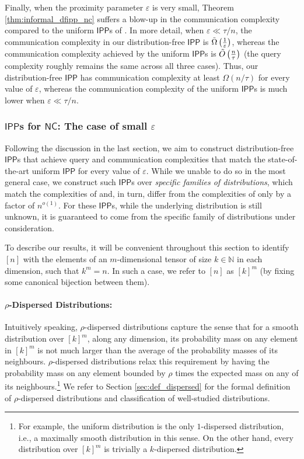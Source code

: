 \documentclass[11pt]{article}
\newcommand{\NC}{\mathsf{NC}}
\newcommand{\IPP}{\mathsf{IPP}}
\newcommand{\N}{\mathbb{N}}
\newcommand{\eps}{\varepsilon}
\begin{document}
Finally, when the proximity parameter $\varepsilon$ is very small, Theorem \ref{thm:informal_dfipp_nc} suffers a blow-up in the communication complexity compared to the uniform $\IPP$s of \cite{RVW,RR20_batch_polylog}. In more detail, when $\varepsilon \ll \tau/n$, the communication complexity in our distribution-free $\IPP$ is $\Tilde{\Omega}\left(\frac{1}{\eps}\right)$, whereas the communication complexity achieved by the uniform $\IPP$s is $\Tilde{O}\left(\frac{n}{\tau}\right)$ (the query complexity roughly remains the same across all three cases). Thus, our distribution-free $\IPP$ has communication complexity at least $\Omega(n/\tau)$ for every value of $\varepsilon$, whereas the communication complexity of the uniform $\IPP$s is much lower when $\varepsilon \ll \tau/n$.

\subsubsection{$\IPP$s for $\NC$: The case of small $\varepsilon$}
Following the discussion in the last section, we aim to construct distribution-free $\IPP$s that achieve query and communication complexities that match the state-of-the-art uniform $\IPP$ for every value of $\varepsilon$. While we unable to do so in the most general case, we construct such $\IPP$s over \textit{specific families of distributions}, which match the complexities of \cite{RVW} and, in turn, differ from the complexities of \cite{RR20_batch_polylog} only by a factor of $n^{o(1)}$. For these $\IPP$s, while the underlying distribution is still unknown, it is guaranteed to come from the specific family of distributions under consideration.

To describe our results, it will be convenient throughout this section to identify $[n]$ with the elements of an $m$-dimensional tensor of size $k \in \N$ in each dimension, such that $k^m = n$. In such a case, we refer to $[n]$ as $[k]^m$ (by fixing some canonical bijection between them).

\paragraph*{$\rho$-Dispersed Distributions:}  Intuitively speaking, $\rho$-dispersed distributions capture the sense that for a smooth distribution over $[k]^m$, along any dimension, its probability mass on any element in $[k]^m$ is not much larger than the average of the probability masses of its neighbours. $\rho$-dispersed distributions relax this requirement by having the probability mass on any element bounded by $\rho$ times the expected mass on any of its neighbours.\footnote{For example, the uniform distribution is the only $1$-dispersed distribution, i.e., a maximally smooth distribution in this sense. On the other hand, every distribution over $[k]^m$ is trivially a $k$-dispersed distribution.} We refer to Section \ref{sec:def_dispersed} for the formal definition of $\rho$-dispersed distributions and classification of well-studied distributions.
\end{document}
